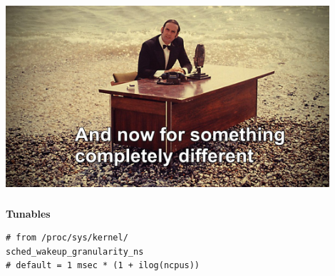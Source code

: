 \documentclass[usenames,dvipsnames, 18pt, compress, aspectratio=169]{beamer}
\begin{document}
\begin{frame}
    \frametitle{}
    \begin{center}

    \includegraphics[width=0.9\textwidth,center]{different.jpg}

    \end{center}
\end{frame}

\begin{frame}[fragile]{}
    \frametitle{}
    \begin{center}
        \textbf{Tunables}

        \begin{flushleft}
        \begin{verbatim}
# from /proc/sys/kernel/
sched_wakeup_granularity_ns
# default = 1 msec * (1 + ilog(ncpus))
        \end{verbatim}
        \end{flushleft}

    \end{center}
\end{frame}
\end{document}
